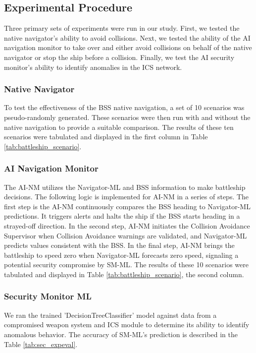 \documentclass[conference]{IEEEtran}
\begin{document}
\subsection{Experimental Procedure}
Three primary sets of experiments were run in our study. First, we tested the native navigator's ability to avoid collisions. Next, we tested the ability of the AI navigation monitor to take over and either avoid collisions on behalf of the native navigator or stop the ship before a collision. Finally, we test the AI security monitor's ability to identify anomalies in the ICS network.
\subsubsection{Native Navigator}
To test the effectiveness of the BSS native navigation, a set of 10 scenarios was pseudo-randomly generated. These scenarios were then run with and without the native navigation to provide a suitable comparison. The results of these ten scenarios were tabulated and displayed in the first column in Table \ref{tab:battleship_scenario}. 
\subsubsection{AI Navigation Monitor}
The AI-NM utilizes the Navigator-ML and BSS information to make battleship decisions. The following logic is implemented for AI-NM in a series of steps. The first step is the AI-NM continuously compares the BSS heading to Navigator-ML predictions. It triggers alerts and halts the ship if the BSS starts heading in a strayed-off direction. In the second step, AI-NM initiates the Collision Avoidance Supervisor when Collision Avoidance warnings are validated, and Navigator-ML predicts values consistent with the BSS. In the final step, AI-NM brings the battleship to speed zero when Navigator-ML forecasts zero speed, signaling a potential security compromise by SM-ML. The results of these 10 scenarios were tabulated and displayed in Table \ref{tab:battleship_scenario}, the second column.
\subsubsection{Security Monitor ML}
We ran the trained 'DecisionTreeClassifier' model against data from a compromised weapon system and ICS module to determine its ability to identify anomalous behavior. The accuracy of SM-ML's prediction is described in the Table \ref{tab:sec_expeval}.

\end{document}
